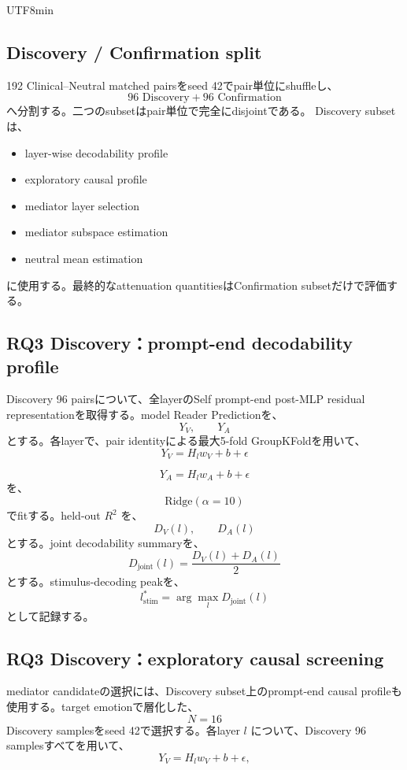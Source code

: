\documentclass{article} %
\begin{document}
\begin{CJK*}{UTF8}{min}
\subsection{Discovery / Confirmation split}

192 Clinical--Neutral matched pairsをseed 42でpair単位にshuffleし、
\[
96\text{ Discovery}
+
96\text{ Confirmation}
\]
へ分割する。二つのsubsetはpair単位で完全にdisjointである。
Discovery subsetは、
\begin{itemize}
    \item layer-wise decodability profile
    \item exploratory causal profile
    \item mediator layer selection
    \item mediator subspace estimation
    \item neutral mean estimation
\end{itemize}
に使用する。最終的なattenuation quantitiesはConfirmation subsetだけで評価する。


\subsection{RQ3 Discovery：prompt-end decodability profile}

Discovery 96 pairsについて、全layerのSelf prompt-end post-MLP residual representationを取得する。model Reader Predictionを、
\[
Y_V,
\qquad
Y_A
\]
とする。各layerで、pair identityによる最大5-fold GroupKFoldを用いて、
\[
Y_V
=
H_lw_V+b+\epsilon
\]

\[
Y_A
=
H_lw_A+b+\epsilon
\]
を、
\[
\text{Ridge}(\alpha=10)
\]
でfitする。held-out \(R^2\) を、
\[
D_V(l),
\qquad
D_A(l)
\]
とする。joint decodability summaryを、
\[
D_{\mathrm{joint}}(l)
=
\frac{
D_V(l)+D_A(l)
}{2}
\]
とする。stimulus-decoding peakを、
\[
l_{\mathrm{stim}}^{*}
=
\arg\max_lD_{\mathrm{joint}}(l)
\]
として記録する。


\subsection{RQ3 Discovery：exploratory causal screening}

mediator candidateの選択には、Discovery subset上のprompt-end causal profileも使用する。target emotionで層化した、
\[
N=16
\]
Discovery samplesをseed 42で選択する。各layer \(l\) について、Discovery 96 samplesすべてを用いて、
\[
Y_V
=
H_lw_V+b+\epsilon,
\]


\end{CJK*}
\end{document}
